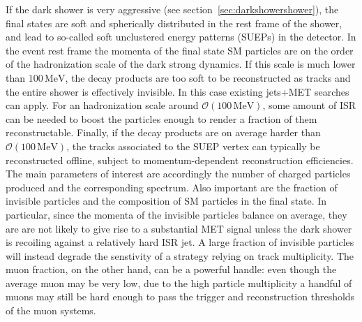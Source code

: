 If the dark shower is very aggressive (see section~\ref{sec:darkshowershower}), the final states are soft and spherically distributed in the rest frame of the shower, and lead to so-called soft unclustered energy patterns (SUEPs) in the detector. In the event rest frame the momenta of the final state SM particles are on the order of the hadronization scale of the dark strong dynamics. If this scale is much lower than $100\,\textrm{MeV}$, the decay products are too soft to be reconstructed as tracks and the entire shower is effectively invisible. In this case existing jets+MET searches can apply. For an hadronization scale around $\mathcal{O}(100\,\textrm{MeV})$, some amount of ISR can be needed to boost the particles enough to render a fraction of them reconstructable. Finally, if the decay products are on average harder than $\mathcal{O}(100\,\textrm{MeV})$, the tracks associated to the SUEP vertex can typically be reconstructed offline, subject to momentum-dependent reconstruction efficiencies. The main parameters of interest are accordingly the number of charged particles produced and the corresponding \pt spectrum. Also important are the fraction of invisible particles and the composition of SM particles in the final state.  In particular, since the momenta of the invisible particles balance on average, they are are not likely to give rise to a substantial MET signal unless the dark shower is recoiling against a relatively hard ISR jet. A large fraction of invisible particles will instead degrade the senstivity of a strategy relying on track multiplicity. The muon fraction, on the other hand, can be a powerful handle: even though the average muon \pt may be very low, due to the high particle multiplicity a handful of muons may still be hard enough to pass the trigger and reconstruction thresholds of the muon systems. 

